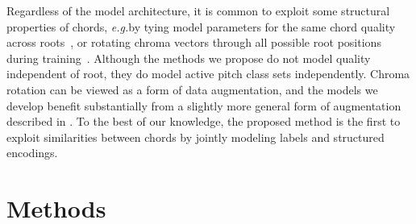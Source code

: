 \documentclass{article}
\def\eg{\emph{e.g.\/}}
\begin{document}
Regardless of the model architecture, it is common to exploit some structural properties of chords, \eg by tying model parameters for the same chord quality across roots~\cite{humphrey2015four}, or rotating chroma vectors through all possible root positions during training~\cite{cho2014improved}.
Although the methods we propose do not model quality independent of root, they do model active pitch class sets independently.
Chroma rotation can be viewed as a form of data augmentation, and the models we develop benefit substantially from a slightly more general form of augmentation described in .
To the best of our knowledge, the proposed method is the first to exploit similarities between chords by jointly modeling labels and structured encodings.











\section{Methods}
\label{sec:methods}



\end{document}
